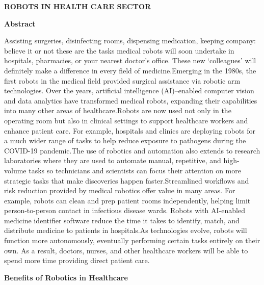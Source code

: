 \documentclass[12pt,a4paper]{report}
\begin{document}
\begin{center}
  \huge{\textbf{ROBOTS IN HEALTH CARE SECTOR}}
\end{center}

\begin{center}
  \small{\textbf{Abstract}}
\end{center}

Assisting surgeries, disinfecting rooms, dispensing medication, keeping company: believe it or not these are the tasks medical robots will soon undertake in hospitals, pharmacies, or your nearest doctor’s office. These new ‘colleagues’ will definitely make a difference in every field of medicine.Emerging in the 1980s, the first robots in the medical field provided surgical assistance via robotic arm technologies. Over the years, artificial intelligence (AI)–enabled computer vision and data analytics have transformed medical robots, expanding their capabilities into many other areas of healthcare.Robots are now used not only in the operating room but also in clinical settings to support healthcare workers and enhance patient care. For example, hospitals and clinics are deploying robots for a much wider range of tasks to help reduce exposure to pathogens during the COVID-19 pandemic.The use of robotics and automation also extends to research laboratories where they are used to automate manual, repetitive, and high-volume tasks so technicians and scientists can focus their attention on more strategic tasks that make discoveries happen faster.Streamlined workflows and risk reduction provided by medical robotics offer value in many areas. For example, robots can clean and prep patient rooms independently, helping limit person-to-person contact in infectious disease wards. Robots with AI-enabled medicine identifier software reduce the time it takes to identify, match, and distribute medicine to patients in hospitals.As technologies evolve, robots will function more autonomously, eventually performing certain tasks entirely on their own. As a result, doctors, nurses, and other healthcare workers will be able to spend more time providing direct patient care.
\begin{center}
  \small{\textbf{Benefits of Robotics in Healthcare }}
\end{center}
\end{document}
